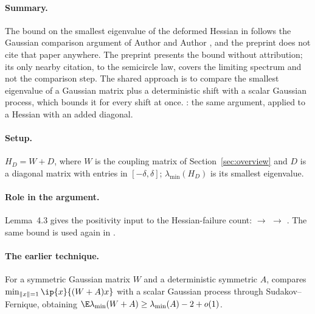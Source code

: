 
\paragraph{Summary.}
The bound on the smallest eigenvalue of the deformed Hessian in
 follows the Gaussian comparison
argument of Author and Author , and the preprint does not cite that paper anywhere. The preprint
presents the bound without attribution; its only nearby citation, to the
semicircle law, covers the limiting spectrum and not the comparison step.
The shared approach is to compare the smallest eigenvalue of a Gaussian matrix
plus a deterministic shift with a scalar Gaussian process, which bounds it for
every shift at once.
: the same argument, applied to a Hessian with an added
diagonal.

\paragraph{Setup.}
$H_D = W + D$, where $W$ is the coupling matrix of Section~\ref{sec:overview}
and $D$ is a diagonal matrix with entries in $[-\delta,\delta]$; $\lambda_{\min}(H_D)$
is its smallest eigenvalue.

\paragraph{Role in the argument.}
Lemma~4.3 gives the positivity input to the Hessian-failure count:
 $\to$ 
$\to$ . The same bound is used again in
.

\paragraph{The earlier technique.}
For a symmetric Gaussian matrix $W$ and a deterministic symmetric $A$,
 compares
$\min_{\|x\|=1}\ip{x}{(W+A)x}$ with a scalar Gaussian process through
Sudakov--Fernique, obtaining
$\E\lambda_{\min}(W+A)\ge \lambda_{\min}(A)-2+o(1)$.

